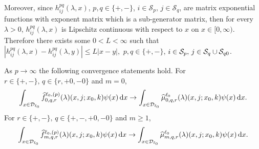 Moreover, since \(h_{ij}^{pq}(\lambda,x)\), \(p,q\in \{+,-\}\), \(i\in\mathcal S_p,\,j\in\mathcal S_q\), are matrix exponential functions with exponent matrix which is a sub-generator matrix, then for every \(\lambda >0\), \(h_{ij}^{pq}(\lambda,x)\) is Lipschitz continuous with respect to \(x\) on \(x\in[0,\infty)\). Therefore there exists some \(0<L<\infty\) such that \(\left|h_{ij}^{pq}(\lambda,x)-h_{ij}^{pq}(\lambda,y)\right|\leq L|x-y|,\) \(p,q\in \{+,-\}\), \(i\in\mathcal S_p,\,j\in\mathcal S_q\cup\mathcal{S}_{q0}\).

\begin{thm}\label{thm: a thm!}
	As \(p\to \infty\) the following convergence statements hold.
	For \(r\in\{+,-\},\, q\in\{r,+0,-0\}\) and \(m=0\),  
	\begin{align}\int_{x\in\mathcal{D}_{\ell_0}}\widehat f_{0,q,r}^{\ell_0,(p)}(\lambda)(x,j;x_0,k)\psi(x)\, \mathrm{d} x \to \int_{x\in\mathcal{D}_{\ell_0}}\widehat \mu_{0,q,r}^{\ell_0}(\lambda)(x,j;x_0,k)\psi(x)\, \mathrm{d} x.\end{align}
	For \(r\in\{+,-\},\, q\in\{+,-,+0,-0\}\) and \(m\geq 1\), 
	\begin{align}\int_{x\in\mathcal{D}_{\ell_0}}\widehat f_{m,q,r}^{\ell_0,(p)}(\lambda)(x,j;x_0,k)\psi(x)\, \mathrm{d} x \to \int_{x\in\mathcal{D}_{\ell_0}}\widehat \mu_{m,q,r}^{\ell_0}(\lambda)(x,j;x_0,k)\psi(x)\, \mathrm{d} x.\label{eqn: thm 2}\end{align}
\end{thm}
